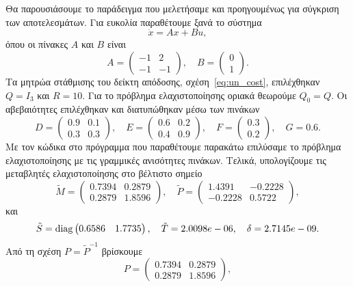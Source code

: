 Θα παρουσιάσουμε το παράδειγμα που μελετήσαμε και προηγουμένως για σύγκριση των
αποτελεσμάτων. Για ευκολία παραθέτουμε ξανά το σύστημα
\[
    \dot{x} = Ax + Bu,
\]
όπου οι πίνακες \( A \) και \( B \) είναι
\[
    A =
    \begin{pmatrix}
        -1 & 2 \\
        -1 & -1
    \end{pmatrix}, \quad
    B = \begin{pmatrix}0 \\ 1\end{pmatrix}.
\]
Τα μητρώα στάθμισης του δείκτη απόδοσης, σχέση~\eqref{eq:un_cost}, επιλέχθηκαν
\( Q = I_3 \) και \( R = 10 \). Για το πρόβλημα ελαχιστοποίησης οριακά θεωρούμε
\( Q_0 = Q \). Οι αβεβαιότητες επιλέχθηκαν και διατυπώθηκαν μέσω των πινάκων
\[
    D =
    \begin{pmatrix}
        0.9 & 0.1 \\
        0.3 & 0.3
    \end{pmatrix},\quad
    E =
    \begin{pmatrix}
        0.6 & 0.2 \\
        0.4 & 0.9
    \end{pmatrix},\quad
    F =
    \begin{pmatrix}
        0.3 \\ 0.2
    \end{pmatrix},\quad
    G = 0.6.
\]
Με τον κώδικα στο πρόγραμμα  που παραθέτουμε παρακάτω επιλύσαμε το
πρόβλημα ελαχιστοποίησης με τις γραμμικές ανισότητες πινάκων. Τελικά,
υπολογίζουμε τις μεταβλητές ελαχιστοποίησης στο βέλτιστο σημείο
\[
    \tilde{M} =
    \begin{pmatrix}
        0.7394 & 0.2879 \\
        0.2879 & 1.8596
    \end{pmatrix},\quad
    \tilde{P} =
    \begin{pmatrix}
        1.4391 & -0.2228 \\
        -0.2228 & 0.5722
    \end{pmatrix},
\]
και
\[
    \tilde{S} = \operatorname{diag}
    \begin{pmatrix}
        0.6586 & 1.7735
    \end{pmatrix},\quad
    \tilde{T} = 2.0098e-06, \quad
    \delta = 2.7145e-09.
\]
Από τη σχέση \( P = \tilde{P}^{-1} \) βρίσκουμε
\[
    P =
    \begin{pmatrix}
        0.7394 & 0.2879 \\
        0.2879 & 1.8596
    \end{pmatrix},
\]
